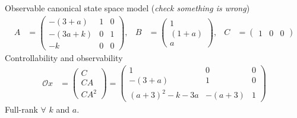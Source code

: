 Observable canonical state space model (\emph{check something is wrong})
\begin{align*}
    A &= \begin{pmatrix}
        -\left(3 + a\right) & 1 & 0\\
        -\left(3a + k\right)& 0 & 1\\     
        -k                  & 0 & 0 
    \end{pmatrix},
    & B &= \begin{pmatrix}
        1 \\
        \left(1 + a\right) \\
        a
    \end{pmatrix},
    & C &= \begin{pmatrix}
        1 & 0 & 0
    \end{pmatrix}
\end{align*}
Controllability and observability
\begin{align*}
    \mathcal{O}x &= \begin{pmatrix}
        C \\ CA \\ CA^2
    \end{pmatrix} = \begin{pmatrix}
        1                   & 0 & 0 \\
        -\left(3 + a\right) & 1 & 0 \\
        (a + 3)^2 -k -3a    & -\left(a +3\right) & 1
    \end{pmatrix}
\end{align*}
Full-rank $\forall$ $k$ and $a$.